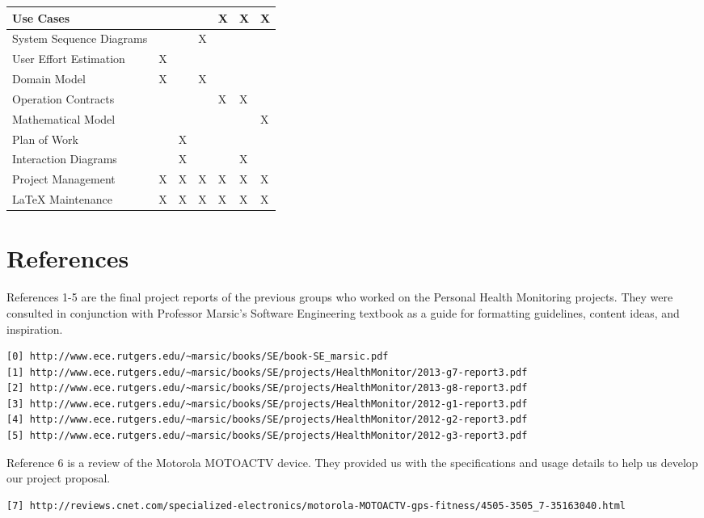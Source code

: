 \documentclass[letterpaper,english, 12pt]{scrreprt}
\begin{document}
\begin{center}
\begin{tabular}{|l|C{2cm}|C{1.5cm}|C{1.5cm}|C{1.5cm}|C{1.5cm}|C{1.5cm}|}
Use Cases       &               &               &               &       X   &       X       &   X    \\ \hline
System Sequence Diagrams&               &               &       X       &           &               &        \\ \hline
User Effort Estimation  &       X       &               &               &           &               &        \\ \hline
Domain Model        &       X       &               &       X       &           &               &        \\ \hline
Operation Contracts &               &               &               &       X   &       X       &        \\ \hline
Mathematical Model  &               &               &               &           &               &   X    \\ \hline
Plan of Work        &               &       X       &               &           &               &        \\ \hline
Interaction Diagrams    &               &       X       &               &           &       X       &        \\ \hline
Project Management  &       X       &       X       &       X       &       X   &       X       &       X\\ \hline
LaTeX Maintenance   &       X       &       X       &       X       &       X   &       X       &       X\\ \hline
    \end{tabular}
\end{center}

\chapter*{References}

References 1-5 are the final project reports of the previous groups who worked on the Personal Health Monitoring projects. They were consulted in conjunction with Professor Marsic's Software Engineering textbook as a guide for formatting guidelines, content ideas, and inspiration. 
\begin{verbatim}
[0] http://www.ece.rutgers.edu/~marsic/books/SE/book-SE_marsic.pdf
[1] http://www.ece.rutgers.edu/~marsic/books/SE/projects/HealthMonitor/2013-g7-report3.pdf
[2] http://www.ece.rutgers.edu/~marsic/books/SE/projects/HealthMonitor/2013-g8-report3.pdf
[3] http://www.ece.rutgers.edu/~marsic/books/SE/projects/HealthMonitor/2012-g1-report3.pdf
[4] http://www.ece.rutgers.edu/~marsic/books/SE/projects/HealthMonitor/2012-g2-report3.pdf
[5] http://www.ece.rutgers.edu/~marsic/books/SE/projects/HealthMonitor/2012-g3-report3.pdf
\end{verbatim}
Reference 6 is a review of the Motorola MOTOACTV device. They provided us with the specifications and usage details to help us develop our project proposal.
\begin{verbatim}
[7] http://reviews.cnet.com/specialized-electronics/motorola-MOTOACTV-gps-fitness/4505-3505_7-35163040.html
\end{verbatim}
\end{document}
